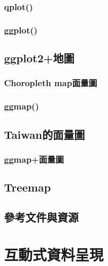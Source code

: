 \documentclass[
]{book}
\begin{document}
\hypertarget{qplot}{%
\subsection{qplot()}\label{qplot}}

\hypertarget{ggplot}{%
\subsection{ggplot()}\label{ggplot}}

\hypertarget{ggplot2ux5730ux5716}{%
\section{ggplot2+地圖}\label{ggplot2ux5730ux5716}}

\hypertarget{choropleth-mapux9762ux91cfux5716}{%
\subsection{Choropleth map面量圖}\label{choropleth-mapux9762ux91cfux5716}}

\hypertarget{ggmap}{%
\subsection{ggmap()}\label{ggmap}}

\hypertarget{taiwanux7684ux9762ux91cfux5716}{%
\section{Taiwan的面量圖}\label{taiwanux7684ux9762ux91cfux5716}}

\hypertarget{ggmapux9762ux91cfux5716}{%
\subsection{ggmap+面量圖}\label{ggmapux9762ux91cfux5716}}

\hypertarget{treemap}{%
\section{Treemap}\label{treemap}}

\hypertarget{ux53c3ux8003ux6587ux4ef6ux8207ux8cc7ux6e90}{%
\section{參考文件與資源}\label{ux53c3ux8003ux6587ux4ef6ux8207ux8cc7ux6e90}}

\hypertarget{InteractiveGraphics}{%
\chapter{互動式資料呈現}\label{InteractiveGraphics}}
\end{document}
